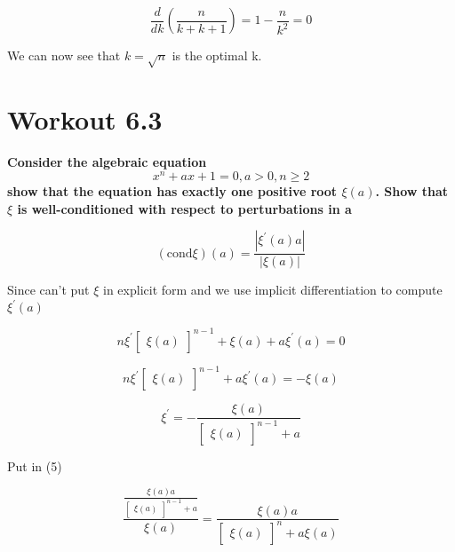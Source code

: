 \documentclass[a4paper]{article}
\begin{document}
\begin{equation}
	\frac{d}{dk}(\frac{n}{k + k +1}) = 1 - \frac{n}{k^2} = 0
\end{equation}

We can now see that $k=\sqrt{n}$ is the optimal k. 

\newpage
\section{Workout 6.3}
\textbf{Consider the algebraic equation}
\begin{equation}
	x^n + ax + 1 = 0, a > 0, n \ge 2
\end{equation}
\textbf{show that the equation has exactly one positive root $\xi(a)$. Show that $\xi$ is well-conditioned with respect to perturbations in a}

\begin{equation}
	(\text{cond}\xi)(a) = \frac{| \xi^{\prime}(a)a |}{|\xi(a)|}
\end{equation}

Since can't put $\xi$ in explicit form and we use implicit differentiation to compute $\xi^{\prime}(a)$

\begin{equation}
	n\xi^{\prime}\begin{bmatrix} \xi(a) \end{bmatrix}^{n-1} + \xi(a) + a\xi^{\prime}(a) = 0 
\end{equation}

\begin{equation}
	n\xi^{\prime}\begin{bmatrix} \xi(a) \end{bmatrix}^{n-1} + a\xi^{\prime}(a) = - \xi(a)  
\nonumber
\end{equation}

\begin{equation}
	\xi^{\prime} = - \frac{\xi(a)}{\begin{bmatrix} \xi(a) \end{bmatrix}^{n-1} +a} 
\nonumber
\end{equation}

Put in (5)

\begin{equation}
	\frac{\frac{\xi(a)a}{\begin{bmatrix} \xi(a) \end{bmatrix}^{n-1} +a}}{\xi(a)} = \frac{\xi(a)a}{\begin{bmatrix} \xi(a) \end{bmatrix}^{n} +a\xi(a)}
\end{equation}
\end{document}
